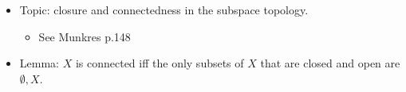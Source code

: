 \begin{concept}

\envlist

\begin{itemize}
\tightlist
\item
  Topic: closure and connectedness in the subspace topology.

  \begin{itemize}
  \tightlist
  \item
    See Munkres p.148
  \end{itemize}
\end{itemize}

\end{concept}

\begin{concept}

\envlist

\begin{itemize}
\tightlist
\item
  Lemma: \(X\) is connected iff the only subsets of \(X\) that are
  closed and open are \(\emptyset, X\).
\end{itemize}

\end{concept}

